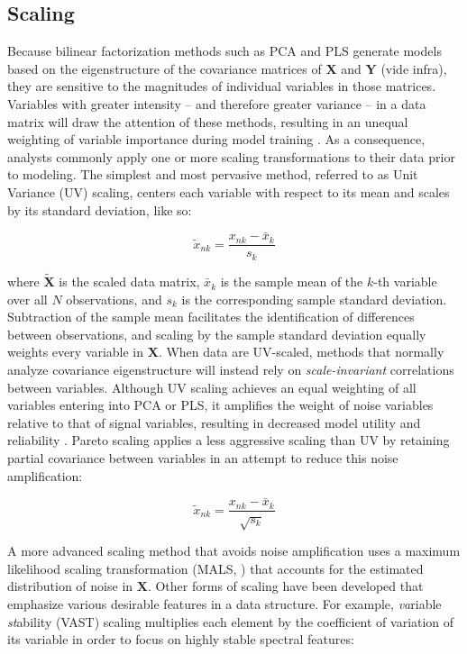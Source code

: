 \subsection{Scaling}

\begin{doublespace}
Because bilinear factorization methods such as PCA and PLS generate models
based on the eigenstructure of the covariance matrices of $\mathbf{X}$ and
$\mathbf{Y}$ (vide infra), they are sensitive to the magnitudes of individual
variables in those matrices. Variables with greater intensity -- and therefore
greater variance -- in a data matrix will draw the attention of these methods,
resulting in an unequal weighting of variable importance during model training
\cite{jolliffe2002,smilde:anchem2005,vandenberg:bmcg2006}. As a consequence,
analysts commonly apply one or more scaling transformations to their data prior
to modeling. The simplest and most pervasive method, referred to as Unit
Variance (UV) scaling, centers each variable with respect to its mean and
scales by its standard deviation, like so:

\begin{equation}
\tilde{x}_{nk} = \frac{x_{nk} - \bar{x}_k}{s_k}
\end{equation}

where $\widetilde{\mathbf{X}}$ is the scaled data matrix, $\bar{x}_k$ is the
sample mean of the $k$-th variable over all $N$ observations, and $s_k$ is the
corresponding sample standard deviation. Subtraction of the sample mean
facilitates the identification of differences between observations, and
scaling by the sample standard deviation equally weights every variable
in $\mathbf{X}$. When data are UV-scaled, methods that normally analyze
covariance eigenstructure will instead rely on {\it scale-invariant}
correlations between variables. Although UV scaling achieves an equal weighting
of all variables entering into PCA or PLS, it amplifies the weight of noise
variables relative to that of signal variables, resulting in decreased model
utility and reliability \cite{hoefsloot:jchemo2006}. Pareto scaling applies a
less aggressive scaling than UV by retaining partial covariance between
variables in an attempt to reduce this noise amplification:

\begin{equation}
\tilde{x}_{nk} = \frac{x_{nk} - \bar{x}_k}{\sqrt{s_k}}
\end{equation}

A more advanced scaling method that avoids noise amplification uses a maximum
likelihood scaling transformation (MALS, \cite{hoefsloot:jchemo2006}) that
accounts for the estimated distribution of noise in $\mathbf{X}$. Other forms
of scaling have been developed that emphasize various desirable features in
a data structure. For example, {\it va}riable {\it st}ability (VAST) scaling
multiplies each element by the coefficient of variation of its variable in
order to focus on highly stable spectral features:


\end{doublespace}
